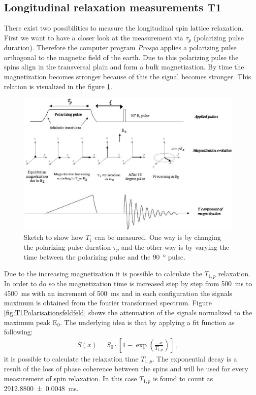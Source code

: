 \subsection{Longitudinal relaxation measurements T1}
\label{sec:LongitudinalrelaxationmeasurementsT1}
There exist two possibilities to measure the longitudinal spin lattice relaxation.
First we want to have a closer look at the measurement via $\tau_p$ (polarizing pulse duration).
Therefore the computer program \textit{Prospa} applies a polarizing pulse orthogonal to the magnetic field of the earth.
Due to this polarizing pulse the spins align in the transversal plain and form a bulk magnetization.
By time the magnetization becomes stronger because of this the signal becomes stronger.
This relation is visualized in the figure \ref{fig:BildT1}.

\begin{figure}[H]
    \centering
    \includegraphics[width= \textwidth]{Abbildungen/BildT1.png}   
    \caption[Sketch to show how $T_1$ can be measured. \cite{Bild}]{Sketch to show how $T_1$ can be measured.
    One way is by changing the polarizing pulse duration $\tau_p$ and the other way is by varying the time between the polarizing pulse and the \SI{90}{\degree} pulse. \cite{Bild}}
    \label{fig:BildT1}
\end{figure}

Due to the increasing magnetization it is possible to calculate the $T_{1,p}$ relaxation.
In order to do so the magnetization time is increased step by step from \SI{500}{\milli \second} to \SI{4500}{\milli \second} with an increment of \SI{500}{\milli \second} and in each configuration the signals maximum is obtained from the fourier transformed spectrum.
Figure \ref{fig:T1Polarisationsfeldfeld} shows the attenuation of the signals normalized to the maximum peak E$_0$.
The underlying idea is that by applying a fit function as following:
\begin{align}
    S(x)=S_0 \cdot \left[1-\exp\left(\frac{-x}{T_{1,p}}\right)\right] \ ,
    \label{eq: fitBp}
\end{align}
it is possible to calculate the relaxation time $T_{1,p}$.
The exponential decay is a result of the loss of phase coherence between the spins and will be used for every measurement of spin relaxation.
In this case $T_{1,p}$ is found to count as \SI{2912.8800 \pm 0.0048}{\milli \second}.

